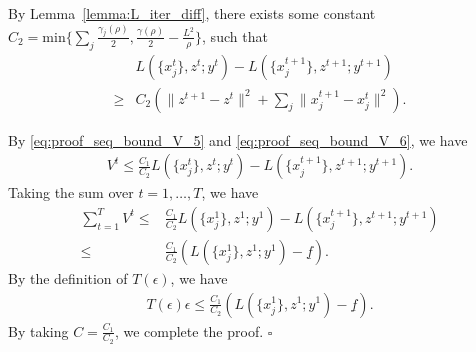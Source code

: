 By Lemma~\ref{lemma:L_iter_diff}, there exists some constant $C_2 = \text{min}\{\sum_j\frac{\gamma_j(\rho)}{2}, \frac{\gamma(\rho)}{2} - \frac{L^2}{\rho}\}$, such that
\begin{align}
    & L(\{x_j^t\}, z^t; y^t) - L(\{x_j^{t+1}\}, z^{t+1}; y^{t+1})\nonumber\\
    \ge & C_2 (\|z^{t+1}-z^t\|^2 + \sum_j\|x_j^{t+1}-x_j^t\|^2). \label{eq:proof_seq_bound_V_6}
\end{align}

By \eqref{eq:proof_seq_bound_V_5} and \eqref{eq:proof_seq_bound_V_6}, we have
\begin{align}
    V^t\le \frac{C_1}{C_2}L(\{x_j^t\}, z^t; y^t) - L(\{x_j^{t+1}\}, z^{t+1}; y^{t+1}).
\end{align}
Taking the sum over $t=1,\ldots, T$, we have
\begin{align}
    \sum_{t=1}^T V^t \le & \frac{C_1}{C_2} L(\{x_j^1\}, z^1; y^1) - L(\{x_j^{t+1}\}, z^{t+1}; y^{t+1})\nonumber\\
    \le & \frac{C_1}{C_2} (L(\{x_j^1\}, z^1; y^1) - \underline{f}).
\end{align}
By the definition of $T(\epsilon)$, we have 
\begin{align}
    T(\epsilon)\epsilon \le \frac{C_1}{C_2} (L(\{x_j^1\}, z^1; y^1)  - \underline{f}).
\end{align}
By taking $C = \frac{C_1}{C_2}$, we complete the proof. \hfill$\square$